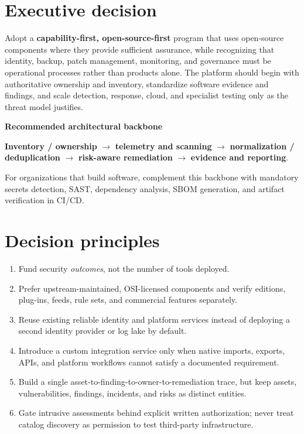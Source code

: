 \documentclass[11pt,oneside]{report}
\newcommand{\term}[1]{\textsf{\textbf{#1}}}
\begin{document}
\section{Executive decision}
Adopt a \term{capability-first, open-source-first} program that uses open-source components where they provide sufficient assurance, while recognizing that identity, backup, patch management, monitoring, and governance must be operational processes rather than products alone. The platform should begin with authoritative ownership and inventory, standardize software evidence and findings, and scale detection, response, cloud, and specialist testing only as the threat model justifies.

\begin{insight}
\textbf{Recommended architectural backbone}\par
\textbf{Inventory / ownership} $\rightarrow$ \textbf{telemetry and scanning} $\rightarrow$ \textbf{normalization / deduplication} $\rightarrow$ \textbf{risk-aware remediation} $\rightarrow$ \textbf{evidence and reporting}.\par
For organizations that build software, complement this backbone with mandatory secrets detection, SAST, dependency analysis, SBOM generation, and artifact verification in CI/CD.
\end{insight}

\section{Decision principles}
\begin{enumerate}[leftmargin=1.6em,itemsep=3pt]
\item Fund security \emph{outcomes}, not the number of tools deployed.
\item Prefer upstream-maintained, OSI-licensed components and verify editions, plug-ins, feeds, rule sets, and commercial features separately.
\item Reuse existing reliable identity and platform services instead of deploying a second identity provider or log lake by default.
\item Introduce a custom integration service only when native imports, exports, APIs, and platform workflows cannot satisfy a documented requirement.
\item Build a single asset-to-finding-to-owner-to-remediation trace, but keep assets, vulnerabilities, findings, incidents, and risks as distinct entities.
\item Gate intrusive assessments behind explicit written authorization; never treat catalog discovery as permission to test third-party infrastructure.
\end{enumerate}
\end{document}
